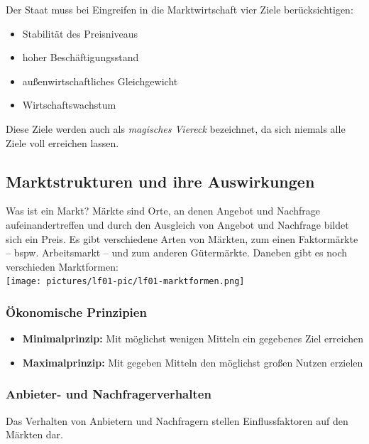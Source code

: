 Der Staat muss bei Eingreifen in die Marktwirtschaft vier Ziele berücksichtigen:
	
\begin{itemize}
	\item Stabilität des Preisniveaus
	\item hoher Beschäftigungsstand 
	\item außenwirtschaftliches Gleichgewicht
	\item Wirtschaftswachstum
\end{itemize}

Diese Ziele werden auch als \textit{magisches Viereck} bezeichnet, da sich niemals alle Ziele voll erreichen lassen.


\subsection{Marktstrukturen und ihre Auswirkungen}

Was ist ein Markt? Märkte sind Orte, an denen Angebot und Nachfrage aufeinandertreffen und durch den Ausgleich von Angebot und Nachfrage bildet sich ein Preis. Es gibt verschiedene Arten von Märkten, zum einen Faktormärkte -- bspw. Arbeitsmarkt -- und zum anderen Gütermärkte. Daneben gibt es noch verschieden Marktformen:\\
\texttt{[image: pictures/lf01-pic/lf01-marktformen.png]}

\subsubsection{Ökonomische Prinzipien}
\begin{itemize}
	\item \textbf{Minimalprinzip:} Mit möglichst wenigen Mitteln ein gegebenes Ziel erreichen
	\item \textbf{Maximalprinzip:} Mit gegeben Mitteln den möglichst großen Nutzen erzielen
\end{itemize}

\subsubsection{Anbieter- und Nachfragerverhalten}
Das Verhalten von Anbietern und Nachfragern stellen Einflussfaktoren auf den Märkten dar.

